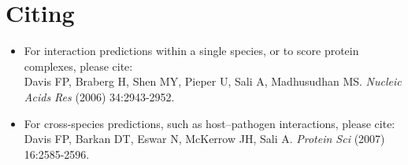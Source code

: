 \documentclass[11pt]{article}
\begin{document}
\section{Citing}
\begin{itemize}
\item For interaction predictions within a single species, or to score protein complexes, please cite:\\Davis FP, Braberg H, Shen MY, Pieper U, Sali A, Madhusudhan MS. {\it Nucleic Acids Res} (2006) 34:2943-2952.

\item For cross-species predictions, such as host--pathogen interactions, please cite:\\Davis FP, Barkan DT, Eswar N, McKerrow JH, Sali A. {\it Protein Sci} (2007) 16:2585-2596.
\end{itemize}
\end{document}
